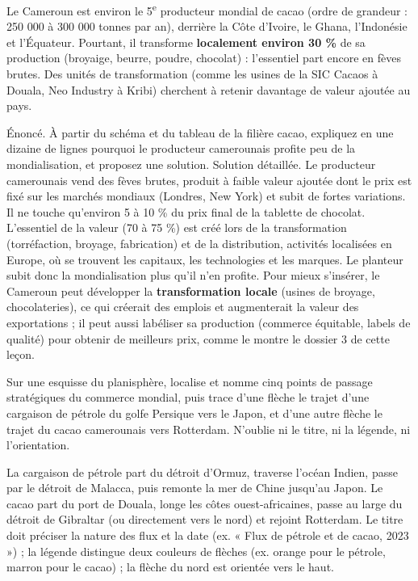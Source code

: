 \documentclass[11pt]{article}
\newcommand{\cle}[1]{{\popxbold\color{popdark}#1}}
\begin{document}
\begin{savaistu}
Le Cameroun est environ le \cle{5\textsuperscript{e} producteur mondial} de cacao (ordre de grandeur : 250 000 à 300 000 tonnes par an), derrière la Côte d'Ivoire, le Ghana, l'Indonésie et l'Équateur. Pourtant, il transforme \textbf{localement environ 30 \%} de sa production (broyaige, beurre, poudre, chocolat) : l'essentiel part encore en fèves brutes. Des unités de transformation (comme les usines de la SIC Cacaos à Douala, Neo Industry à Kribi) cherchent à retenir davantage de valeur ajoutée au pays.
\end{savaistu}

\begin{exoresolu}
Énoncé. À partir du schéma et du tableau de la filière cacao, expliquez en une dizaine de lignes pourquoi le producteur camerounais profite peu de la mondialisation, et proposez une solution.
\tcblower
Solution détaillée. Le producteur camerounais vend des fèves brutes, produit à faible valeur ajoutée dont le prix est fixé sur les marchés mondiaux (Londres, New York) et subit de fortes variations. Il ne touche qu'environ 5 à 10 \% du prix final de la tablette de chocolat. L'essentiel de la valeur (70 à 75 \%) est créé lors de la transformation (torréfaction, broyage, fabrication) et de la distribution, activités localisées en Europe, où se trouvent les capitaux, les technologies et les marques. Le planteur subit donc la mondialisation plus qu'il n'en profite. Pour mieux s'insérer, le Cameroun peut développer la \textbf{transformation locale} (usines de broyage, chocolateries), ce qui créerait des emplois et augmenterait la valeur des exportations ; il peut aussi labéliser sa production (commerce équitable, labels de qualité) pour obtenir de meilleurs prix, comme le montre le dossier 3 de cette leçon.
\end{exoresolu}

\begin{exercice}
Sur une esquisse du planisphère, localise et nomme cinq points de passage stratégiques du commerce mondial, puis trace d'une flèche le trajet d'une cargaison de pétrole du golfe Persique vers le Japon, et d'une autre flèche le trajet du cacao camerounais vers Rotterdam. N'oublie ni le titre, ni la légende, ni l'orientation.
\end{exercice}

\begin{corrige}
La cargaison de pétrole part du détroit d'Ormuz, traverse l'océan Indien, passe par le détroit de Malacca, puis remonte la mer de Chine jusqu'au Japon. Le cacao part du port de Douala, longe les côtes ouest-africaines, passe au large du détroit de Gibraltar (ou directement vers le nord) et rejoint Rotterdam. Le titre doit préciser la nature des flux et la date (ex. « Flux de pétrole et de cacao, 2023 ») ; la légende distingue deux couleurs de flèches (ex. orange pour le pétrole, marron pour le cacao) ; la flèche du nord est orientée vers le haut.
\end{corrige}
\end{document}
